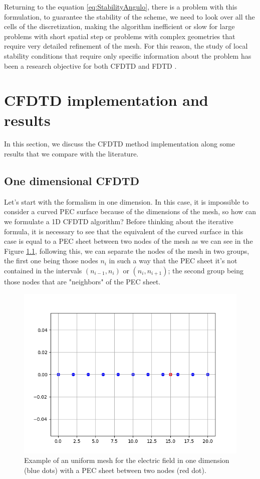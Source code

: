 \documentclass[12pt, oneside]{book}
\begin{document}
Returning to the equation \ref{eq:StabilityAngulo}, there is a problem with this formulation, to guarantee the stability of the scheme, we need to look over all the cells of the discretization, making the algorithm inefficient or slow for large problems with short spatial step or problems with complex geometries that require very detailed refinement of the mesh. For this reason, the study of local stability conditions that require only specific information about the problem has been a research objective for both CFDTD and FDTD \cite{7779120}.

\chapter{CFDTD implementation and results}

In this section, we discuss the CFDTD method implementation along some results that we compare with the literature.
\section{One dimensional CFDTD}
Let's start with the formalism in one dimension. In this case, it is impossible to consider a curved PEC surface because of the dimensions of the mesh, so how can we formulate a 1D CFDTD algorithm? Before thinking about the iterative formula, it is necessary to see that the equivalent of the curved surface in this case is equal to a PEC sheet between two nodes of the mesh as we can see in the Figure \ref{fig:Mesh1D_CFDTD}, following this, we can separate the nodes of the mesh in two groups, the first one being those nodes $n_i$ in such a way that the PEC sheet it's not contained in the intervals $(n_{i-1}, n_i)$ or $(n_i, n_{i+1})$; the second group being those nodes that are "neighbors" of the PEC sheet. 
\begin{figure}[h]
    \centering
    \includegraphics[scale=0.8]{Imagenes/Mesh1D_CFDTD.png}
    \caption{Example of an uniform mesh for the electric field in one dimension (blue dots) with a PEC sheet between two nodes (red dot).}
    \label{fig:Mesh1D_CFDTD}
\end{figure}
\end{document}

